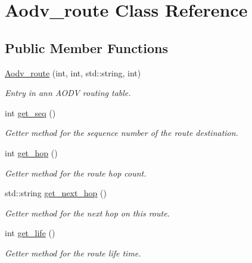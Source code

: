 \hypertarget{class_aodv__route}{}\section{Aodv\+\_\+route Class Reference}
\label{class_aodv__route}
\subsection*{Public Member Functions}
\begin{DoxyCompactItemize}
\item 
\hyperlink{class_aodv__route_a666f0dc139dddaf794a7d61ecc5c5817}{Aodv\+\_\+route} (int, int, std\+::string, int)\hypertarget{class_aodv__route_a666f0dc139dddaf794a7d61ecc5c5817}{}\label{class_aodv__route_a666f0dc139dddaf794a7d61ecc5c5817}

\begin{DoxyCompactList}\small\item\em Entry in ann A\+O\+DV routing table. \end{DoxyCompactList}\item 
int \hyperlink{class_aodv__route_a68a80d4a583d553ebaf032ff6533c7a6}{get\+\_\+seq} ()\hypertarget{class_aodv__route_a68a80d4a583d553ebaf032ff6533c7a6}{}\label{class_aodv__route_a68a80d4a583d553ebaf032ff6533c7a6}

\begin{DoxyCompactList}\small\item\em Getter method for the sequence number of the route destination. \end{DoxyCompactList}\item 
int \hyperlink{class_aodv__route_abc9740b17cdf00ca25d0f6b4679820c0}{get\+\_\+hop} ()\hypertarget{class_aodv__route_abc9740b17cdf00ca25d0f6b4679820c0}{}\label{class_aodv__route_abc9740b17cdf00ca25d0f6b4679820c0}

\begin{DoxyCompactList}\small\item\em Getter method for the route hop count. \end{DoxyCompactList}\item 
std\+::string \hyperlink{class_aodv__route_a323b2c66c323c9af9d991893be8d5857}{get\+\_\+next\+\_\+hop} ()\hypertarget{class_aodv__route_a323b2c66c323c9af9d991893be8d5857}{}\label{class_aodv__route_a323b2c66c323c9af9d991893be8d5857}

\begin{DoxyCompactList}\small\item\em Getter method for the next hop on this route. \end{DoxyCompactList}\item 
int \hyperlink{class_aodv__route_a6c06635874c9269443ea782586bbbc91}{get\+\_\+life} ()\hypertarget{class_aodv__route_a6c06635874c9269443ea782586bbbc91}{}\label{class_aodv__route_a6c06635874c9269443ea782586bbbc91}

\begin{DoxyCompactList}\small\item\em Getter method for the route life time. \end{DoxyCompactList}\end{DoxyCompactItemize}
